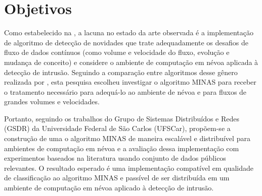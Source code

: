 \section{Objetivos}\label{sec:objetivos}


Como estabelecido na , a lacuna no estado da arte observada é
a  implementação de algoritmo de detecção de
novidades que trate adequadamente os desafios de fluxo de dados contínuos
(como volume e velocidade do fluxo, evolução e mudança de conceito)
e considere o ambiente de computação em névoa aplicada à detecção de
intrusão.
Seguindo a comparação entre algoritmos desse gênero realizada por
, esta pesquisa escolheu investigar o algoritmo MINAS \cite{Faria2015minas}
para receber o tratamento necessário para adequá-lo ao ambiente de névoa e para
fluxos de grandes volumes e velocidades.


Portanto, seguindo os trabalhos do Grupo de Sistemas Distribuídos e Redes
(GSDR) da Universidade Federal de São Carlos (UFSCar), propõem-se a construção
de uma 
 o algoritmo MINAS
de maneira escalável e distribuível para ambientes de computação em névoa e a avaliação
dessa implementação com experimentos baseados na literatura usando conjunto de dados
públicos relevantes.
O resultado esperado é uma implementação compatível em qualidade de
classificação ao algoritmo MINAS e passível de ser distribuída em um ambiente
de computação em névoa aplicado à detecção de intrusão.



% 

